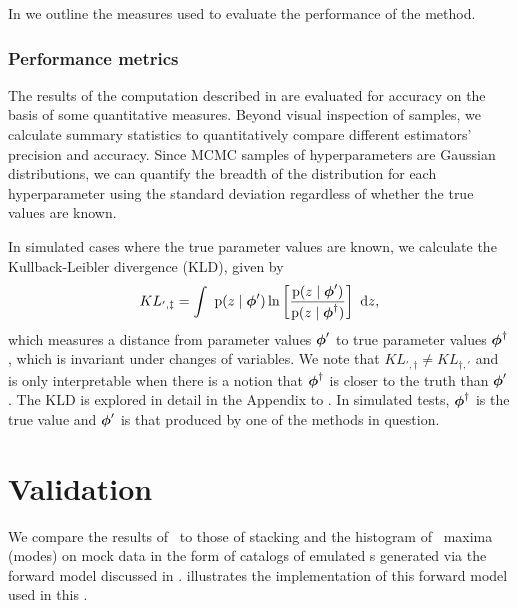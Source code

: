 In  we outline the measures used to evaluate the performance of the method.

\subsubsection{Performance metrics}

The results of the computation described in  are evaluated for accuracy on the basis of some quantitative measures.  
Beyond visual inspection of samples, we calculate summary statistics to quantitatively compare different estimators' precision and accuracy.  
Since MCMC samples of hyperparameters are Gaussian distributions, we can quantify the breadth of the distribution for each hyperparameter using the standard deviation regardless of whether the true values are known.  

In simulated cases where the true parameter values are known, we calculate the Kullback-Leibler divergence (KLD), given by 
\begin{equation}
\eqlabel{eqn:kl}
KL_{',\ddagger} = \integral{\pr{z \gvn \ndphi'} \ln \left[ \frac{\pr{z \gvn \ndphi'}}{\pr{z \gvn \ndphi^{\dagger}}} \right]}{z} ,
\end{equation}
which measures a distance from parameter values ${\boldsymbol{\phi}}'$ to true parameter values ${\boldsymbol{\phi}}^{\dagger}$, which is invariant under changes of variables.  
We note that $KL_{',\dagger} \neq KL_{\dagger,'}$ and is only interpretable when there is a notion that ${\boldsymbol{\phi}}^{\dagger}$ is closer to the truth than ${\boldsymbol{\phi}}'$.
The KLD is explored in detail in the Appendix to .
In simulated tests, ${\boldsymbol{\phi}}^{\dagger}$ is the true value and ${\boldsymbol{\phi}}'$ is that produced by one of the methods in question.

\section{Validation}

We compare the results of \Chippr\ to those of stacking and the histogram of \pzpdf\ maxima (modes) on mock data in the form of catalogs of emulated \pzpdf s generated via the forward model discussed in .
 illustrates the implementation of this forward model used in this \paper.

